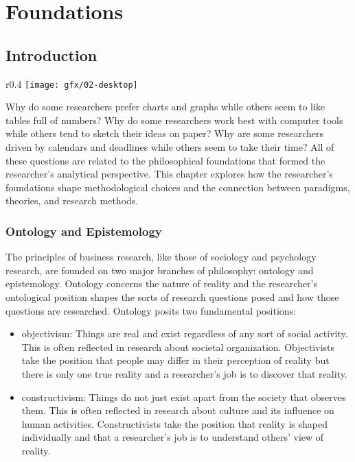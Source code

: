 \chapter{Foundations}\label{02:foundations}

\section{Introduction}

\begin{wrapfigure}{r}{0.4\textwidth}
	\label{05:fig01} 
	\centering
	\texttt{[image: gfx/02-desktop]} 
\end{wrapfigure}
Why do some researchers prefer charts and graphs while others seem to like tables full of numbers? Why do some researchers work best with computer tools while others tend to sketch their ideas on paper? Why are some researchers driven by calendars and deadlines while others seem to take their time? All of these questions are related to the philosophical foundations that formed the researcher's analytical perspective. This chapter explores how the researcher's foundations shape methodological choices and the connection between paradigms, theories, and research methods. 

\subsection{Ontology and Epistemology}\label{02:ontology}

The principles of business research, like those of sociology and psychology research, are founded on two major branches of philosophy: \gls{ontology} and \gls{epistemology}. Ontology concerns the nature of reality and the researcher's ontological position shapes the sorts of research questions posed and how those questions are researched. Ontology posits two fundamental positions:

\begin{itemize}
	\item \Gls{objectivism}: Things are real and exist regardless of any sort of social activity. This is often reflected in research about societal organization. Objectivists take the position that people may differ in their perception of reality but there is only one true reality and a researcher's job is to discover that reality.

	\item \Gls{constructivism}: Things do not just exist apart from the society that observes them. This is often reflected in research about culture and its influence on human activities. Constructivists take the position that reality is shaped individually and that a researcher's job is to understand others' view of reality. 
\end{itemize}


